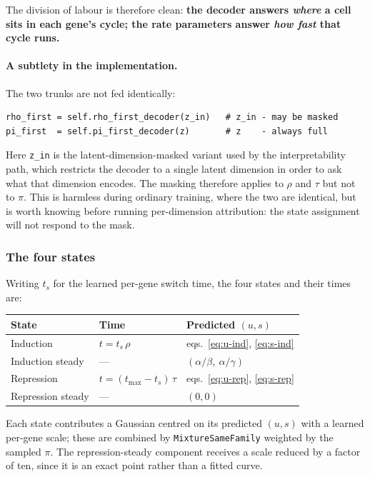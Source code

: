 \documentclass[11pt,a4paper]{article}
\newenvironment{keybox}{\begin{shaded}\noindent}{\end{shaded}}
\newcommand{\uns}{u}
\newcommand{\spl}{s}
\newcommand{\ts}{t_{s}}
\newcommand{\tmax}{t_{\max}}
\theoremstyle{definition}
\begin{document}
\begin{keybox}
The division of labour is therefore clean: \textbf{the decoder answers
\emph{where} a cell sits in each gene's cycle; the rate parameters answer
\emph{how fast} that cycle runs.}
\end{keybox}

\paragraph{A subtlety in the implementation.} The two trunks are not fed
identically:
%
\begin{lstlisting}
rho_first = self.rho_first_decoder(z_in)   # z_in - may be masked
pi_first  = self.pi_first_decoder(z)       # z    - always full
\end{lstlisting}
%
Here \texttt{z\_in} is the latent-dimension-masked variant used by the
interpretability path, which restricts the decoder to a single latent dimension
in order to ask what that dimension encodes. The masking therefore applies to
$\rho$ and $\tau$ but not to $\pi$. This is harmless during ordinary training,
where the two are identical, but is worth knowing before running per-dimension
attribution: the state assignment will not respond to the mask.

\subsubsection{The four states}

Writing $\ts$ for the learned per-gene switch time, the four states and their
times are:

\begin{center}
\begin{tabular}{@{}lll@{}}
\toprule
\textbf{State} & \textbf{Time} & \textbf{Predicted $(\uns, \spl)$} \\
\midrule
Induction         & $t = \ts\,\rho$                & eqs.\ \eqref{eq:u-ind}, \eqref{eq:s-ind} \\
Induction steady  & ---                            & $(\alpha/\beta,\ \alpha/\gamma)$ \\
Repression        & $t = (\tmax - \ts)\,\tau$      & eqs.\ \eqref{eq:u-rep}, \eqref{eq:s-rep} \\
Repression steady & ---                            & $(0, 0)$ \\
\bottomrule
\end{tabular}
\end{center}

Each state contributes a Gaussian centred on its predicted $(\uns, \spl)$ with a
learned per-gene scale; these are combined by \texttt{MixtureSameFamily}
weighted by the sampled $\pi$. The repression-steady component receives a scale
reduced by a factor of ten, since it is an exact point rather than a fitted
curve.
\end{document}
